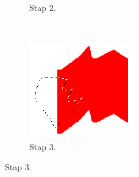 \documentclass{article}
\begin{document}
\begin{figure}[Hh]
\begin{subfigure}[b]{0.3\textwidth}
        \caption{Stap 2.}
        \label{fig:stap2}
    \end{subfigure}%
    ~
    \begin{subfigure}[b]{0.3\textwidth}    
        \includegraphics[width=\textwidth]{piece3.png}
        \caption{Stap 3.}
        \label{fig:stap3}
    \end{subfigure}%


\end{figure}
\end{document}
